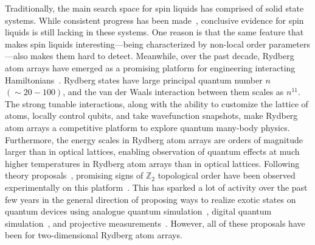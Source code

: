 \documentclass[twocolumn,superscriptaddress,amsmath,amssymb,aps,prx,nofootinbib]{revtex4-2}
\begin{document}
Traditionally, the main search space for spin liquids has comprised of solid state systems. While consistent progress has been made~\cite{savary2017,knolle2019field}, conclusive evidence for spin liquids is still lacking in these systems. One reason is that the same feature that makes spin liquids interesting---being characterized by non-local order parameters---also makes them hard to detect. Meanwhile, over the past decade, Rydberg atom arrays have emerged as a promising platform for engineering interacting Hamiltonians~\cite{weimer2010rydberg,ebadi2021quantum,wu2021concise,saffman2010,lukin2001,labuhn2016,jaksch2000,browaeys2016,barredo2016anatom,beguin2013,barredo2018,semeghini2021, bernien2017probing,bluvstein2022quantum,guardado-sanchez2018probing,keesling2019quantum,levine2019parallel,lienhard2018observing,madjarov2020highfidelity,omran2019generation,schauss2015crystallization,song2021quantum}. Rydberg states have large principal quantum number $n$ $(\sim 20-100)$, and the van der Waals interaction between them scales as $n^{11}$. The strong tunable interactions, along with the ability to customize the lattice of atoms, locally control qubits, and take wavefunction snapshots, make Rydberg atom arrays a competitive platform to explore quantum many-body physics. 
Furthermore, the energy scales in Rydberg atom arrays are orders of magnitude larger than in optical lattices, enabling observation of quantum effects at much higher temperatures in Rydberg atom arrays than in optical lattices.
Following theory proposals~\cite{verresen2021,samajdar2021}, promising signs of $\mathbb{Z}_2$ topological order have been observed experimentally on this platform~\cite{semeghini2021}. This has sparked a lot of activity over the past few years in the general direction of proposing ways to realize exotic states on quantum devices using analogue quantum simulation~\cite{myerson2022construction,slagle2022quantum, giudice2022trimer,zhou2022quantum, tarabunga2023classification, kornjaca2023trimer,ohler2023quantum,samajdar2023emergent}, digital quantum simulation~\cite{liu2021methods}, and projective measurements~\cite{tantivasadakarn2022shortest,verresen2021efficiently}. However, all of these proposals have been for two-dimensional Rydberg atom arrays.
\end{document}
